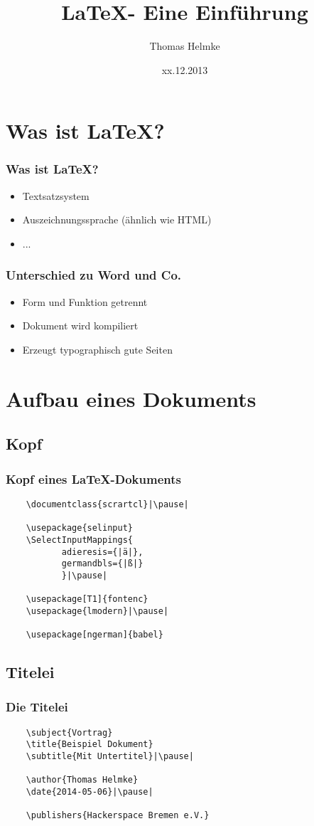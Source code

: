 \documentclass{beamer}
\title{\LaTeX - Eine Einführung}
\author{Thomas Helmke}
\date{xx.12.2013}
\begin{document}
\maketitle
\frame{\tableofcontents}
 
\section{Was ist \LaTeX?}
\begin{frame}[<+->] %
	\frametitle{Was ist \LaTeX?} %
	\begin{itemize}
		\item Textsatzsystem
		\item Auszeichnungssprache (ähnlich wie HTML)
		\item ...
	\end{itemize}
\end{frame}
\begin{frame}[<+->] %
	\frametitle{Unterschied zu Word und Co.} %
	\begin{itemize}
		\item Form und Funktion getrennt
		\item Dokument wird kompiliert
		\item Erzeugt typographisch gute Seiten 
	\end{itemize}
\end{frame}

\setbeamercovered{}
\section{Aufbau eines Dokuments}
\subsection{Kopf}
\begin{frame}[fragile] %
	\frametitle{Kopf eines \LaTeX-Dokuments} %
	\begin{lstlisting}
	\documentclass{scrartcl}|\pause|
	
	\usepackage{selinput}
	\SelectInputMappings{
		   adieresis={|ä|},
		   germandbls={|ß|}
		   }|\pause|
		   
	\usepackage[T1]{fontenc}
	\usepackage{lmodern}|\pause|
	
	\usepackage[ngerman]{babel}
	\end{lstlisting}
\end{frame}
\subsection{Titelei}
\begin{frame}[fragile] %
	\frametitle{Die Titelei} %
	\begin{lstlisting}
	\subject{Vortrag}
	\title{Beispiel Dokument}
	\subtitle{Mit Untertitel}|\pause|
	
	\author{Thomas Helmke}
	\date{2014-05-06}|\pause|
	
	\publishers{Hackerspace Bremen e.V.}
	\end{lstlisting}
\end{frame}
\end{document}
